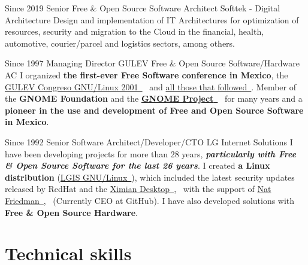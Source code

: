\documentclass[]{friggeri-cv}
\begin{document}
\begin{entrylist}
    \entry%
    {Since 2019}
    {Senior Free \& Open Source Software Architect}
    {Softtek - Digital Architecture}
    {Design and implementation of IT Architectures for optimization of resources, security and migration to the Cloud in the financial, health, automotive, courier/parcel and logistics sectors, among others.}
\end{entrylist}

\begin{entrylist}
    \entry%
    {Since 1997}
    {Managing Director}
    {GULEV Free \& Open Source Software/Hardware AC}
    {I organized \textbf{the first-ever Free Software conference in Mexico}, the \href{http://gulev.org.mx/eventos/gulev2001}{GULEV Congreso GNU/Linux 2001~{\nfURL}}~ and \href{http://gulev.org.mx/conferences}{all those that followed~{\nfURL}}. Member of the \textbf{GNOME Foundation} and the \href{https://www.gnome.org/}{\textbf{GNOME Project}~{\nfURL}}~ for many years and a \textbf{pioneer in the use and development of Free and Open Source Software in Mexico}. }
\end{entrylist}

\begin{entrylist}
    \entry%
    {Since 1992}
    {Senior Software Architect/Developer/CTO}
    {LG Internet Solutions}
    {I have been developing projects for more than 28 years, \textbf{\textit{particularly with Free \& Open Source Software for the last 26 years}}. I created \textbf{a Linux distribution} (\href{https://distrowatch.com/table.php?distribution=lgis}{LGIS GNU/Linux~{\nfURL}}), which included the latest security updates released by RedHat and the \href{https://en.wikipedia.org/wiki/Ximian}{Ximian Desktop~{\nfURL}},~ with the support of \href{https://www.linkedin.com/in/natfriedman/}{Nat Friedman~{\nfURL}},~ (Currently CEO at GitHub). I have also developed solutions with \textbf{Free \& Open Source Hardware}.}
\end{entrylist}

\section{Technical skills}
\end{document}
